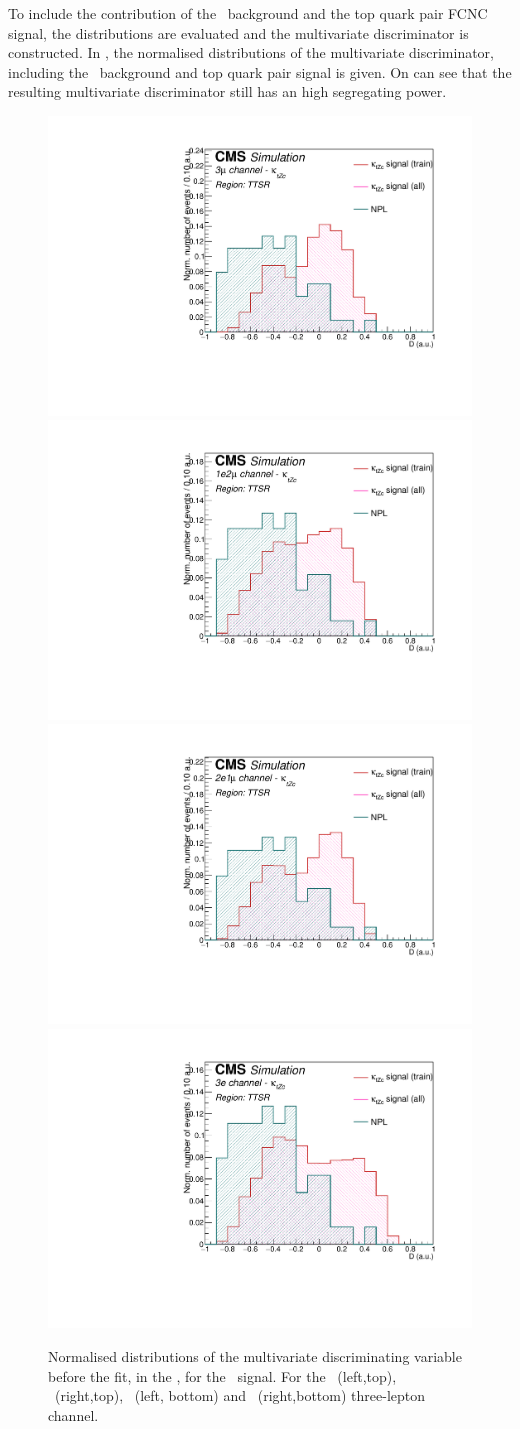 To include the contribution of the \NPL\ background and the top quark pair FCNC signal, the distributions are evaluated and the multivariate discriminator is constructed. In , the normalised distributions of the multivariate discriminator, including the \NPL\ background and top quark pair signal is given. On can see that the resulting multivariate discriminator still has an high segregating power.
\begin{figure}[htbp]
	\centering
	\includegraphics[width=0.49\linewidth]{6_Search/Figures/PlotsTechnicsRead/BDTtechnicsallZcttoppairuuu}
	\includegraphics[width=0.49\linewidth]{6_Search/Figures/PlotsTechnicsRead/BDTtechnicsallZcttoppairuue}
	\includegraphics[width=0.49\linewidth]{6_Search/Figures/PlotsTechnicsRead/BDTtechnicsallZcttoppaireeu}
	\includegraphics[width=0.49\linewidth]{6_Search/Figures/PlotsTechnicsRead/BDTtechnicsallZcttoppaireee}
	\caption{Normalised distributions of the multivariate discriminating variable before the fit, in the \TTSR, for the \Zct\ signal. For the \mumumu\ (left,top), \emumu\ (right,top), \eemu\ (left, bottom) and \eee\ (right,bottom) three-lepton channel.}
	\label{fig:bdtTTSRZct}
\end{figure}	
\clearpage

